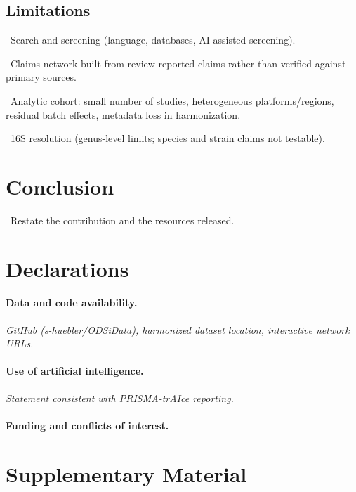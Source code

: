 \documentclass[11pt,a4paper]{article}
\newcommand{\todoitem}[1]{\par\noindent\textcolor{blue!70!black}{\textbullet~#1}}
\newcommand{\placeholder}[1]{\par\medskip\noindent\colorbox{gray!15}{\parbox{\dimexpr\linewidth-2\fboxsep}{%
  \small\textit{#1}}}\par\medskip}
\begin{document}
\subsection{Limitations}
\label{sec:limitations}
\todoitem{Search and screening (language, databases, AI-assisted screening).}
\todoitem{Claims network built from review-reported claims rather than verified against primary sources.}
\todoitem{Analytic cohort: small number of studies, heterogeneous platforms/regions, residual batch effects, metadata loss in harmonization.}
\todoitem{16S resolution (genus-level limits; species and strain claims not testable).}


\section{Conclusion}
\label{sec:conclusion}
\todoitem{Restate the contribution and the resources released.}



\section*{Declarations}
\paragraph{Data and code availability.}\mbox{}
\placeholder{GitHub (s-huebler/ODSiData), harmonized dataset location, interactive network URLs.}
\paragraph{Use of artificial intelligence.}\mbox{}
\placeholder{Statement consistent with PRISMA-trAIce reporting.}
\paragraph{Funding and conflicts of interest.}\mbox{}
\placeholder{}

\printbibliography


\appendix
\section{Supplementary Material}
\label{sec:supplement}
\end{document}
